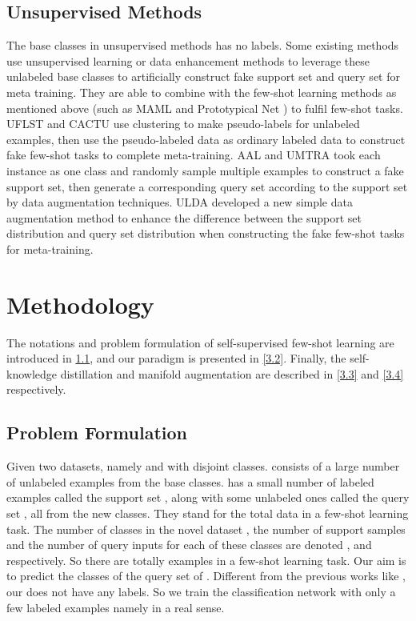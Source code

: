\documentclass[conference]{IEEEtran}
\begin{document}
\subsection{Unsupervised Methods}
The base classes in unsupervised methods has no labels. Some existing methods use unsupervised learning or data enhancement methods to leverage these unlabeled base classes to artificially construct fake support set and query set for meta training. They are able to combine with the few-shot learning methods as mentioned above (such as MAML \cite{finn2017model} and Prototypical Net \cite{snell2017prototypical}) to fulfil few-shot tasks. UFLST \cite{ji2019unsupervised} and CACTU \cite{hsu2018unsupervised} use clustering to make pseudo-labels for unlabeled examples, then use the pseudo-labeled data as ordinary labeled data to construct fake few-shot tasks to complete meta-training.  AAL \cite{antoniou2019assume} and UMTRA \cite{khodadadeh2019unsupervised} took each instance as one class and randomly sample multiple examples to construct a fake support set, then generate a corresponding query set according to the support set by data augmentation techniques. ULDA \cite{qin2020unsupervised} developed a new simple data augmentation method to enhance the difference between the support set distribution and query set distribution when constructing the fake few-shot tasks for meta-training.
\section{Methodology}\label{Section 3}
The notations and problem formulation of self-supervised few-shot learning are introduced in \ref{3.1}, and our paradigm is presented in \ref{3.2}. Finally, the self-knowledge distillation and manifold augmentation are described in \ref{3.3} and \ref{3.4} respectively. 
\subsection{Problem Formulation}\label{3.1}
Given two datasets, namely  and  with disjoint classes.  consists of a large number of unlabeled examples from the base classes.  has a small number of labeled examples called the support set , along with some unlabeled ones called the query set , all from the new classes. They stand for the total data in a few-shot learning task. The number of classes in the novel dataset , the number of support samples and the number of query inputs for each of these classes are denoted ,  and  respectively. So there are totally  examples in a few-shot learning task. Our aim is to predict the classes of the query set of . 
Different from the previous works like \cite{ravi2016optimization}, our  does not have any labels. So we train the classification network with only a few labeled examples namely  in a real sense.
\end{document}
